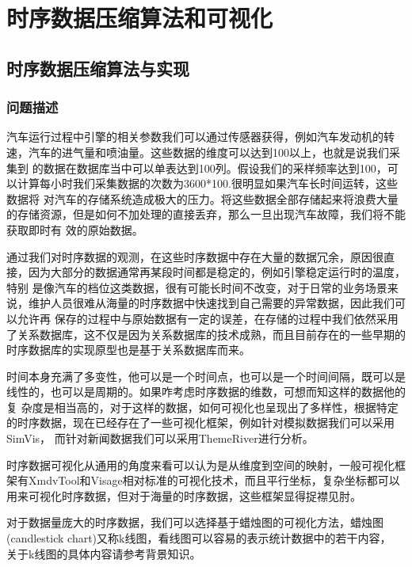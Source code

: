 
\chapter{时序数据压缩算法和可视化}
\label{Chapter 4}

\section{时序数据压缩算法与实现}
\label{section 4.1}
\subsection{问题描述}
\label{section 4.11}
汽车运行过程中引擎的相关参数我们可以通过传感器获得，例如汽车发动机的转速，汽车的进气量和喷油量。这些数据的维度可以达到100以上，也就是说我们采集到
的数据在数据库当中可以单表达到100列。假设我们的采样频率达到100，可以计算每小时我们采集数据的次数为3600*100.很明显如果汽车长时间运转，这些数据将
对汽车的存储系统造成极大的压力。将这些数据全部存储起来将浪费大量的存储资源，但是如何不加处理的直接丢弃，那么一旦出现汽车故障，我们将不能获取即时有
效的原始数据。

通过我们对时序数据的观测，在这些时序数据中存在大量的数据冗余，原因很直接，因为大部分的数据通常再某段时间都是稳定的，例如引擎稳定运行时的温度，特别
是像汽车的档位这类数据，很有可能长时间不改变，对于日常的业务场景来说，维护人员很难从海量的时序数据中快速找到自己需要的异常数据，因此我们可以允许再
保存的过程中与原始数据有一定的误差，在存储的过程中我们依然采用了关系数据库，这不仅是因为关系数据库的技术成熟，而且目前存在的一些早期的时序数据库的实现原型也是基于关系数据库而来。


时间本身充满了多变性，他可以是一个时间点，也可以是一个时间间隔，既可以是线性的，也可以是周期的。如果咋考虑时序数据的维数，可想而知这样的数据他的复
杂度是相当高的，对于这样的数据，如何可视化也呈现出了多样性，根据特定的时序数据，现在已经存在了一些可视化框架，例如针对模拟数据我们可以采用SimVis，
而针对新闻数据我们可以采用ThemeRiver进行分析。

时序数据可视化从通用的角度来看可以认为是从维度到空间的映射，一般可视化框架有XmdvTool和Visage相对标准的可视化技术，而且平行坐标，复杂坐标都可以用来可视化时序数据，但对于海量的时序数据，这些框架显得捉襟见肘。

对于数据量庞大的时序数据，我们可以选择基于蜡烛图的可视化方法，蜡烛图(candlestick chart)又称k线图，看线图可以容易的表示统计数据中的若干内容，
关于k线图的具体内容请参考背景知识。


